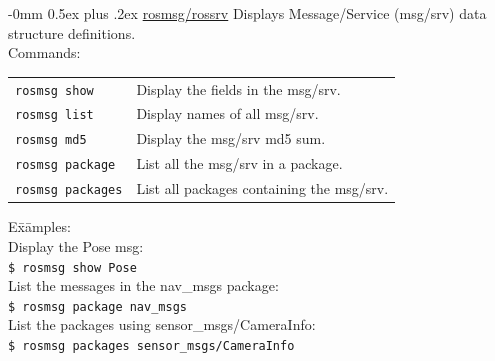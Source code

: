 \documentclass[10pt,landscape]{article}
\makeatletter
\renewcommand{\subsection}{\@startsection{subsection}{2}{0mm}%
                                {-0mm}%
                                {0.5ex plus .2ex}%
                                {\normalfont\normalsize\bfseries}}
\newenvironment{nstabbing}
  {\setlength{\topsep}{1pt}%
   \setlength{\partopsep}{1pt}%
   \tabbing}
  {\endtabbing}
\makeatother
\begin{document}
\begin{multicols}{3}
\subsection{\href{http://wiki.ros.org/rosmsg}{rosmsg/rossrv}}
Displays Message/Service (msg/srv) data structure definitions.\\
Commands: \\
\begin{tabular}{p{\the\MyLen}%
                @{}p{\linewidth-\the\MyLen}@{}}
\texttt{rosmsg show}    & Display the fields in the msg/srv. \\
\texttt{rosmsg list}    & Display names of all msg/srv. \\
\texttt{rosmsg md5}    & Display the msg/srv md5 sum. \\
\texttt{rosmsg package} & List all the msg/srv in a package. \\
\texttt{rosmsg packages}    & List all packages containing the msg/srv.
\end{tabular}
\begin{nstabbing}
E\=x\=amples:\\
\> Display the Pose msg:\\
\> \> \texttt{\$ rosmsg show Pose}\\
\> List the messages in the nav\_msgs package:\\
\> \> \texttt{\$ rosmsg package nav\_msgs}\\
\> List the packages using sensor\_msgs/CameraInfo:\\
\> \> \texttt{\$ rosmsg packages sensor\_msgs/CameraInfo}
\end{nstabbing}




\end{multicols}
\end{document}
